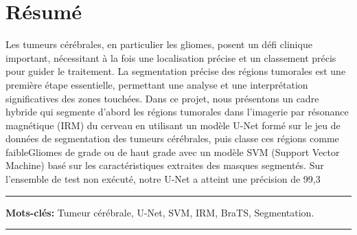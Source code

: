 \chapter*{\hfill Résumé \hfill}

Les tumeurs cérébrales, en particulier les gliomes, posent un défi clinique important, nécessitant à la fois une localisation précise et un classement précis pour guider le traitement. La segmentation précise des régions tumorales est une première étape essentielle, permettant une analyse et une interprétation significatives des zones touchées. Dans ce projet, nous présentons un cadre hybride qui segmente d’abord les régions tumorales dans l’imagerie par résonance magnétique (IRM) du cerveau en utilisant un modèle U-Net formé sur le jeu de données de segmentation des tumeurs cérébrales, puis classe ces régions comme faibleGliomes de grade ou de haut grade avec un modèle SVM (Support Vector Machine) basé sur les caractéristiques extraites des masques segmentés. Sur l’ensemble de test non exécuté, notre U-Net a atteint une précision de 99,3 %


\noindent\rule{\textwidth}{0.2pt}
\textbf{Mots-clés:} Tumeur cérébrale, U-Net, SVM, IRM, BraTS, Segmentation.\\
\noindent\rule{\textwidth}{0.2pt}
